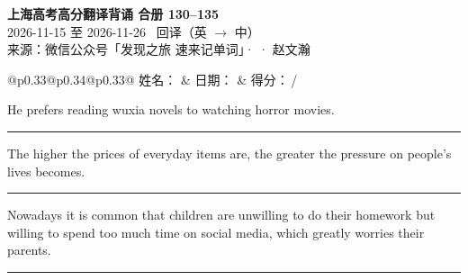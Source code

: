 \documentclass[11pt,a4paper]{article}
\newcommand{\num}[1]{\makebox[1.9em][r]{#1.}\hspace{0.3em}}
\newcommand{\wline}{\noindent\rule{\linewidth}{0.4pt}}
\begin{document}
\pagestyle{plain}
\begin{center}
{\LARGE\bfseries 上海高考高分翻译背诵 \quad 合册 130–135}\\[0.25em]
{\large 2026-11-15 至 2026-11-26 \quad\ 回译（英 $\to$ 中）}\\[0.35em]
{\footnotesize 来源：微信公众号「发现之旅 速来记单词」·  · 赵文瀚}
\end{center}

\vspace{0.4em}
\noindent\begin{tabular}{@{}p{0.33\textwidth}@{}p{0.34\textwidth}@{}p{0.33\textwidth}@{}}
姓名：\underline{\hspace{2.0cm}} & 日期：\underline{\hspace{2.0cm}} & 得分：\underline{\hspace{1.4cm}}\,/ \\
\end{tabular}

\vspace{0.5em}

\vspace{0.8em}
\vspace{0.35em}\vspace{0.15em}

\begin{minipage}{\linewidth}

\num{1}He prefers reading wuxia novels to watching horror movies.

\vspace{0.25em}

\wline

\end{minipage}

\begin{minipage}{\linewidth}

\num{2}The higher the prices of everyday items are, the greater the pressure on people’s lives becomes.

\vspace{0.25em}

\wline

\end{minipage}

\begin{minipage}{\linewidth}

\num{3}Nowadays it is common that children are unwilling to do their homework but willing to spend too much time on social media, which greatly worries their parents.

\vspace{0.25em}

\wline

\end{minipage}
\end{document}
